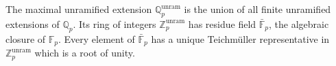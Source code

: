 The maximal unramified extension $\mathbb{Q}_p^{\text{unram}}$ is the union of all finite unramified extensions of $\mathbb{Q}_p$. Its ring of integers $\mathbb{Z}_p^{\text{unram}}$ has residue field $\bar{\mathbb{F}}_p$, the algebraic closure of $\mathbb{F}_p$. Every element of $\bar{\mathbb{F}}_p$ has a unique Teichmüller representative in $\mathbb{Z}_p^{\text{unram}}$ which is a root of unity.
